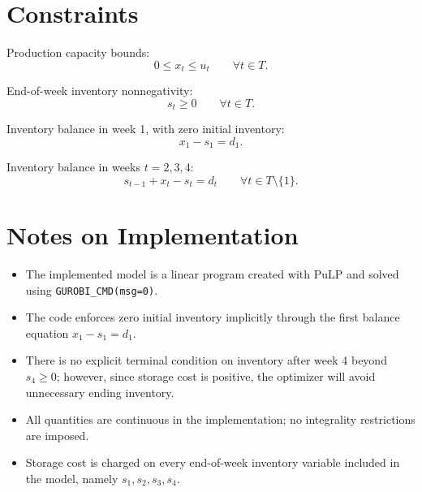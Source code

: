 \section*{Constraints}

Production capacity bounds:
\[
0 \le x_t \le u_t \qquad \forall t \in T.
\]

End-of-week inventory nonnegativity:
\[
s_t \ge 0 \qquad \forall t \in T.
\]

Inventory balance in week 1, with zero initial inventory:
\[
x_1 - s_1 = d_1.
\]

Inventory balance in weeks $t=2,3,4$:
\[
s_{t-1} + x_t - s_t = d_t \qquad \forall t \in T \setminus \{1\}.
\]

\section*{Notes on Implementation}

\begin{itemize}
    \item The implemented model is a linear program created with PuLP and solved using \texttt{GUROBI\_CMD(msg=0)}.
    \item The code enforces zero initial inventory implicitly through the first balance equation $x_1 - s_1 = d_1$.
    \item There is no explicit terminal condition on inventory after week 4 beyond $s_4 \ge 0$; however, since storage cost is positive, the optimizer will avoid unnecessary ending inventory.
    \item All quantities are continuous in the implementation; no integrality restrictions are imposed.
    \item Storage cost is charged on every end-of-week inventory variable included in the model, namely $s_1,s_2,s_3,s_4$.
\end{itemize}
